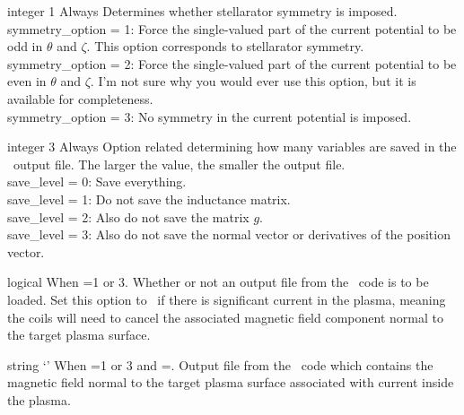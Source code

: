\myhrule

{integer}
{1}
{Always}
{Determines whether stellarator symmetry is imposed.\\

{\ttfamily symmetry\_option} = 1: Force the single-valued part of the current potential
to be odd in $\theta$ and $\zeta$. This option corresponds to stellarator symmetry.\\

{\ttfamily symmetry\_option} = 2: Force the single-valued part of the current potential
to be even in $\theta$ and $\zeta$. I'm not sure why you would ever use this option,
but it is available for completeness.\\

{\ttfamily symmetry\_option} = 3: No symmetry in the current potential is imposed.
}

\myhrule

{integer}
{3}
{Always}
{Option related determining how many variables are saved in the \netCDF~output file.  The larger the value, the smaller the output file.\\

{\ttfamily save\_level} = 0: Save everything.\\

{\ttfamily save\_level} = 1: Do not save the inductance matrix.\\

{\ttfamily save\_level} = 2: Also do not save the matrix $g$.\\

{\ttfamily save\_level} = 3: Also do not save the normal vector or derivatives of the position vector.
}

\myhrule

{logical}
{\false}
{When =1 or 3.}
{Whether or not an output file from the \bnorm~code is to be loaded.
Set this option to \true~if there is significant current in the plasma,
meaning the coils will need to cancel the associated magnetic field component normal
to the target plasma surface.
}

\myhrule

{string}
{`'}
{When =1 or 3 and =\true.}
{Output file from the \bnorm~code which contains the magnetic field normal to the target
plasma surface associated with current inside the plasma.}

\myhrule

